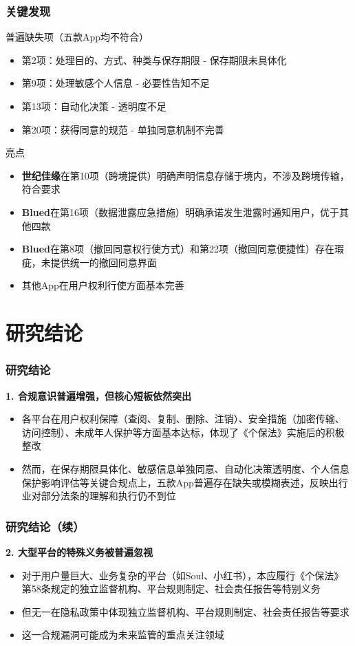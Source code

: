 \documentclass[AutoFakeBold,AutoFakeSlant]{beamer}
\begin{document}
\begin{frame}
	\frametitle{关键发现}
	\small
	\begin{block}{普遍缺失项（五款App均不符合）}
		\begin{itemize}
			\item 第2项：处理目的、方式、种类与保存期限 - 保存期限未具体化
			\item 第9项：处理敏感个人信息 - 必要性告知不足
			\item 第13项：自动化决策 - 透明度不足
			\item 第20项：获得同意的规范 - 单独同意机制不完善
		\end{itemize}
	\end{block}
	
	\begin{block}{亮点}
		\begin{itemize}
			\item \textbf{世纪佳缘}在第10项（跨境提供）明确声明信息存储于境内，不涉及跨境传输，符合要求
			\item \textbf{Blued}在第16项（数据泄露应急措施）明确承诺发生泄露时通知用户，优于其他四款
			\item \textbf{Blued}在第8项（撤回同意权行使方式）和第22项（撤回同意便捷性）存在瑕疵，未提供统一的撤回同意界面
			\item 其他App在用户权利行使方面基本完善
		\end{itemize}
	\end{block}

\end{frame}



\section{研究结论}
\begin{frame}
	\frametitle{研究结论}
	\textbf{1. 合规意识普遍增强，但核心短板依然突出}
	\begin{itemize}
		\item 各平台在用户权利保障（查阅、复制、删除、注销）、安全措施（加密传输、访问控制）、未成年人保护等方面基本达标，体现了《个保法》实施后的积极整改
		\item 然而，在保存期限具体化、敏感信息单独同意、自动化决策透明度、个人信息保护影响评估等关键合规点上，五款App普遍存在缺失或模糊表述，反映出行业对部分法条的理解和执行仍不到位
	\end{itemize}
\end{frame}

\begin{frame}
	\frametitle{研究结论（续）}
	\textbf{2. 大型平台的特殊义务被普遍忽视}
	\begin{itemize}
		\item 对于用户量巨大、业务复杂的平台（如Soul、小红书），本应履行《个保法》第58条规定的独立监督机构、平台规则制定、社会责任报告等特别义务
		\item 但无一在隐私政策中体现独立监督机构、平台规则制定、社会责任报告等要求
		\item 这一合规漏洞可能成为未来监管的重点关注领域
	\end{itemize}
\end{frame}
\end{document}

